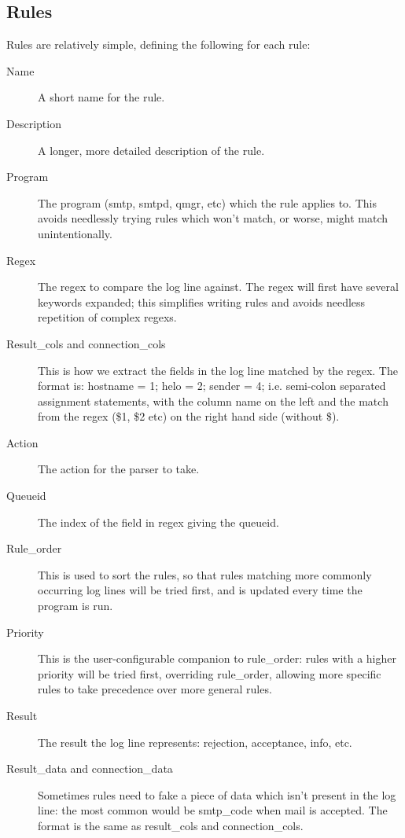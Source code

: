 \documentclass[a4paper,12pt,draft]{article}
\begin{document}
\subsection{Rules}

Rules are relatively simple, defining the following for each rule:

\begin{description}

    \item [Name] A short name for the rule.

    \item [Description] A longer, more detailed description of the rule.

    \item [Program] The program (smtp, smtpd, qmgr, etc) which the rule
        applies to.  This avoids needlessly trying rules which won't
        match, or worse, might match unintentionally.

    \item [Regex] The regex to compare the log line against.  The regex
        will first have several keywords expanded; this simplifies writing
        rules and avoids needless repetition of complex regexs.

    \item [Result\_cols and connection\_cols] This is how we extract the
        fields in the log line matched by the regex.  The format is:
        \newline 
        hostname = 1; helo = 2; sender = 4; \newline
        i.e. semi-colon separated assignment statements, with the column
        name on the left and the match from the regex (\$1, \$2 etc) on the
        right hand side (without \$).

    \item [Action] The action for the parser to take.

    \item [Queueid] The index of the field in regex giving the queueid.

    \item [Rule\_order] This is used to sort the rules, so that rules
        matching more commonly occurring log lines will be tried first, and
        is updated every time the program is run.

    \item [Priority] This is the user-configurable companion to
        rule\_order: rules with a higher priority will be tried first,
        overriding rule\_order, allowing more specific rules to take
        precedence over more general rules.

    \item [Result]  The result the log line represents: rejection,
        acceptance, info, etc.

    \item [Result\_data and connection\_data] Sometimes rules need to fake
        a piece of data which isn't present in the log line: the most
        common would be smtp\_code when mail is accepted.  The format is
        the same as result\_cols and connection\_cols.

\end{description}
\end{document}
